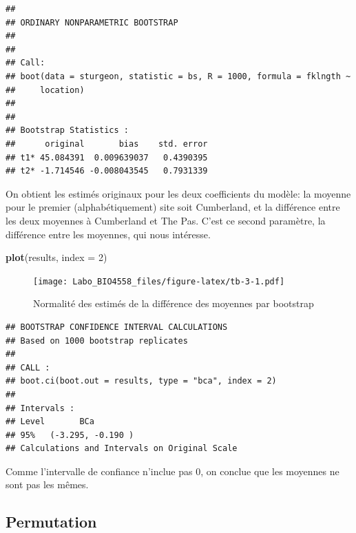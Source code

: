 \documentclass[12pt,]{book}
\newenvironment{Shaded}{\begin{snugshade}}{\end{snugshade}}
\newcommand{\CommentTok}[1]{\textcolor[rgb]{0.37,0.37,0.37}{\textit{#1}}}
\newcommand{\DataTypeTok}[1]{\textcolor[rgb]{0.27,0.27,0.27}{#1}}
\newcommand{\DecValTok}[1]{\textcolor[rgb]{0.06,0.06,0.06}{#1}}
\newcommand{\KeywordTok}[1]{\textcolor[rgb]{0.27,0.27,0.27}{\textbf{#1}}}
\newcommand{\NormalTok}[1]{#1}
\newcommand{\StringTok}[1]{\textcolor[rgb]{0.5,0.5,0.5}{#1}}
\begin{document}
\begin{verbatim}
## 
## ORDINARY NONPARAMETRIC BOOTSTRAP
## 
## 
## Call:
## boot(data = sturgeon, statistic = bs, R = 1000, formula = fklngth ~ 
##     location)
## 
## 
## Bootstrap Statistics :
##      original       bias    std. error
## t1* 45.084391  0.009639037   0.4390395
## t2* -1.714546 -0.008043545   0.7931339
\end{verbatim}

On obtient les estimés originaux pour les deux coefficients du modèle: la moyenne pour le premier (alphabétiquement) site soit Cumberland, et la différence entre les deux moyennes à Cumberland et The Pas. C'est ce second paramètre, la différence entre les moyennes, qui nous intéresse.

\begin{Shaded}
\begin{Highlighting}[]
\KeywordTok{plot}\NormalTok{(results, }\DataTypeTok{index =} \DecValTok{2}\NormalTok{)}
\end{Highlighting}
\end{Shaded}

\begin{figure}
\centering
\texttt{[image: Labo\_BIO4558\_files/figure-latex/tb-3-1.pdf]}
\caption{\label{fig:tb-3}Normalité des estimés de la différence des moyennes par bootstrap}
\end{figure}

\begin{Shaded}
\end{Shaded}

\begin{verbatim}
## BOOTSTRAP CONFIDENCE INTERVAL CALCULATIONS
## Based on 1000 bootstrap replicates
## 
## CALL : 
## boot.ci(boot.out = results, type = "bca", index = 2)
## 
## Intervals : 
## Level       BCa          
## 95%   (-3.295, -0.190 )  
## Calculations and Intervals on Original Scale
\end{verbatim}

Comme l'intervalle de confiance n'inclue pas 0, on conclue que les moyennes ne sont pas les mêmes.

\hypertarget{permutation}{%
\subsection{Permutation}\label{permutation}}
\end{document}
